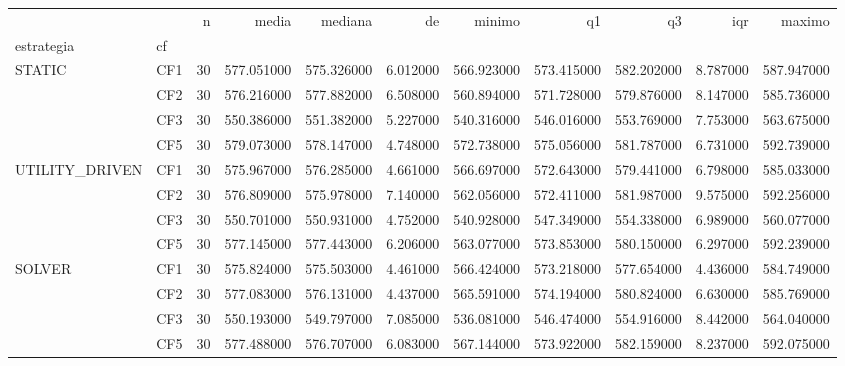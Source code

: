 \begin{tabular}{llrrrrrrrrr}
\toprule
 &  & n & media & mediana & de & minimo & q1 & q3 & iqr & maximo \\
estrategia & cf &  &  &  &  &  &  &  &  &  \\
\midrule
\multirow[t]{4}{*}{STATIC} & CF1 & 30 & 577.051000 & 575.326000 & 6.012000 & 566.923000 & 573.415000 & 582.202000 & 8.787000 & 587.947000 \\
 & CF2 & 30 & 576.216000 & 577.882000 & 6.508000 & 560.894000 & 571.728000 & 579.876000 & 8.147000 & 585.736000 \\
 & CF3 & 30 & 550.386000 & 551.382000 & 5.227000 & 540.316000 & 546.016000 & 553.769000 & 7.753000 & 563.675000 \\
 & CF5 & 30 & 579.073000 & 578.147000 & 4.748000 & 572.738000 & 575.056000 & 581.787000 & 6.731000 & 592.739000 \\
\cline{1-11}
\multirow[t]{4}{*}{UTILITY_DRIVEN} & CF1 & 30 & 575.967000 & 576.285000 & 4.661000 & 566.697000 & 572.643000 & 579.441000 & 6.798000 & 585.033000 \\
 & CF2 & 30 & 576.809000 & 575.978000 & 7.140000 & 562.056000 & 572.411000 & 581.987000 & 9.575000 & 592.256000 \\
 & CF3 & 30 & 550.701000 & 550.931000 & 4.752000 & 540.928000 & 547.349000 & 554.338000 & 6.989000 & 560.077000 \\
 & CF5 & 30 & 577.145000 & 577.443000 & 6.206000 & 563.077000 & 573.853000 & 580.150000 & 6.297000 & 592.239000 \\
\cline{1-11}
\multirow[t]{4}{*}{SOLVER} & CF1 & 30 & 575.824000 & 575.503000 & 4.461000 & 566.424000 & 573.218000 & 577.654000 & 4.436000 & 584.749000 \\
 & CF2 & 30 & 577.083000 & 576.131000 & 4.437000 & 565.591000 & 574.194000 & 580.824000 & 6.630000 & 585.769000 \\
 & CF3 & 30 & 550.193000 & 549.797000 & 7.085000 & 536.081000 & 546.474000 & 554.916000 & 8.442000 & 564.040000 \\
 & CF5 & 30 & 577.488000 & 576.707000 & 6.083000 & 567.144000 & 573.922000 & 582.159000 & 8.237000 & 592.075000 \\
\cline{1-11}
\bottomrule
\end{tabular}
